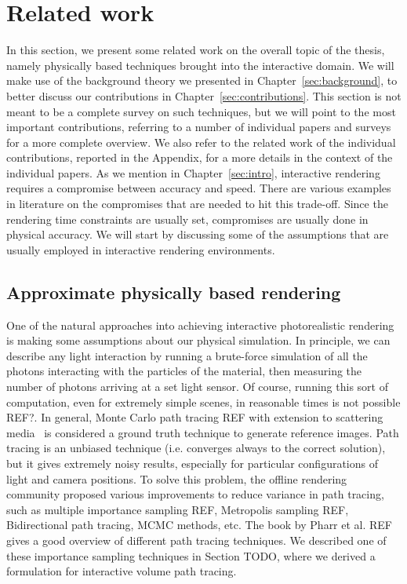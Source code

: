 \chapter{Related work}




%
\label{sec:related}
%
In this section, we present some related work on the overall topic of the thesis, namely physically based techniques brought into the interactive domain. We will make use of the background theory we presented in Chapter~\ref{sec:background}, to better discuss our contributions in Chapter~\ref{sec:contributions}. This section is not meant to be a complete survey on such techniques, but we will point to the most important contributions, referring to a number of individual papers and surveys for a more complete overview. We also refer to the related work of the individual contributions, reported in the Appendix, for a more details in the context of the individual papers. 
%
As we mention in Chapter~\ref{sec:intro}, interactive rendering requires a compromise between accuracy and speed. There are various examples in literature on the compromises that are needed to hit this trade-off. Since the rendering time constraints are usually set, compromises are usually done in physical accuracy. We will start by discussing some of the assumptions that are usually employed in interactive rendering environments. 
%
\section{Approximate physically based rendering}

One of the natural approaches into achieving interactive photorealistic rendering is making some assumptions about our physical simulation. In principle, we can describe any light interaction by running a brute-force simulation of all the photons interacting with the particles of the material, then measuring the number of photons arriving at a set light sensor. Of course, running this sort of computation, even for extremely simple scenes, in reasonable times is not possible REF?. In general, Monte Carlo path tracing REF with extension to scattering media~\cite{Rushmeier1988} is considered a ground truth technique to generate reference images. Path tracing is an unbiased technique (i.e. converges always to the correct solution), but it gives extremely noisy results, especially for particular configurations of light and camera positions. To solve this problem, the offline rendering community proposed various improvements to reduce variance in path tracing, such as multiple importance sampling REF, Metropolis sampling REF, Bidirectional path tracing, MCMC methods, etc. The book by Pharr et al. REF gives a good overview of different path tracing techniques. We described one of these importance sampling techniques in Section TODO, where we derived a formulation for interactive volume path tracing.

